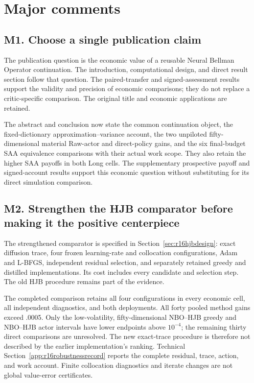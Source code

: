 \section{Major comments}
\subsection*{M1. Choose a single publication claim}\label{resp:M1}
The publication question is the economic value of a reusable Neural Bellman Operator continuation. The introduction, computational design, and direct result section follow that question. The paired-transfer and signed-assessment results support the validity and precision of economic comparisons; they do not replace a critic-specific comparison. The original title and economic applications are retained.

The abstract and conclusion now state the common continuation object, the fixed-dictionary approximation--variance account, the two unpiloted fifty-dimensional material Raw-actor and direct-policy gains, and the six final-budget SAA equivalence comparisons with their actual work scope. They also retain the higher SAA payoffs in both Long cells. The supplementary prospective payoff and signed-account results support this economic question without substituting for its direct simulation comparison.

\subsection*{M2. Strengthen the HJB comparator before making it the positive centerpiece}\label{resp:M2}
The strengthened comparator is specified in Section~\ref{sec:r16hjbdesign}: exact diffusion trace, four frozen learning-rate and collocation configurations, Adam and L-BFGS, independent residual selection, and separately retained greedy and distilled implementations. Its cost includes every candidate and selection step. The old HJB procedure remains part of the evidence.

The completed comparison retains all four configurations in every economic cell, all independent diagnostics, and both deployments. All forty pooled method gains exceed .0005. Only the low-volatility, fifty-dimensional NBO--HJB greedy and NBO--HJB actor intervals have lower endpoints above $10^{-4}$; the remaining thirty direct comparisons are unresolved. The new exact-trace procedure is therefore not described by the earlier implementation's ranking. Technical Section~\ref{app:r16robustnessrecord} reports the complete residual, trace, action, and work account. Finite collocation diagnostics and iterate changes are not global value-error certificates.

